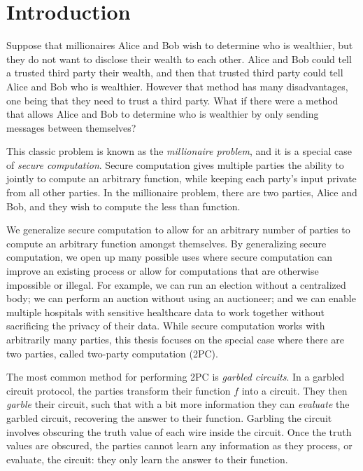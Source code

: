

\chapter*{Introduction}

Suppose that millionaires Alice and Bob wish to determine who is wealthier, but they do not want to disclose their wealth to each other.
Alice and Bob could tell a trusted third party their wealth, and then that trusted third party could tell Alice and Bob who is wealthier.
However that method has many disadvantages, one being that they need to trust a third party.
What if there were a method that allows Alice and Bob to determine who is wealthier by only sending messages between themselves?

This classic problem is known as the \textit{millionaire problem}, and it is a special case of \textit{secure computation}.
Secure computation gives multiple parties the ability to jointly to compute an arbitrary function, while keeping each party's input private from all other parties.
In the millionaire problem, there are two parties, Alice and Bob, and they wish to compute the less than function.

We generalize secure computation to allow for an arbitrary number of parties to compute an arbitrary function amongst themselves. 
By generalizing secure computation, we open up many possible uses where secure computation can improve an existing process or allow for computations that are otherwise impossible or illegal. 
For example, we can run an election without a centralized body; we can perform an auction without using an auctioneer; and we can enable multiple hospitals with sensitive healthcare data to work together without sacrificing the privacy of their data.
While secure computation works with arbitrarily many parties, this thesis focuses on the special case where there are two parties, called two-party computation (2PC).

The most common method for performing 2PC is \textit{garbled circuits}.
In a garbled circuit protocol, the parties transform their function $f$ into a circuit. 
They then \textit{garble} their circuit, such that with a bit more information they can \textit{evaluate} the garbled circuit, recovering the answer to their function.
Garbling the circuit involves obscuring the truth value of each wire inside the circuit.
Once the truth values are obscured, the parties cannot learn any information as they process, or evaluate, the circuit: they only learn the answer to their function.

